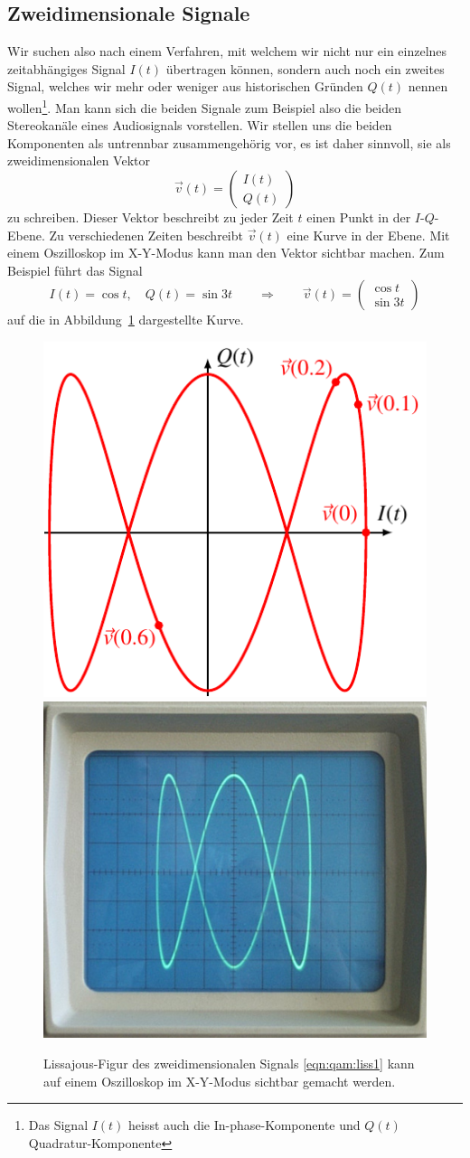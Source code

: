 %
%
%
\subsection{Zweidimensionale Signale
\label{subsection:qam:zweidimensional}}
Wir suchen also nach einem Verfahren, mit welchem wir nicht nur
ein einzelnes zeitabhängiges Signal $I(t)$ übertragen können, sondern
auch noch ein zweites Signal, welches wir mehr oder weniger aus
historischen Gründen $Q(t)$ nennen wollen\footnote{Das Signal $I(t)$
heisst auch die In-phase-Komponente und $Q(t)$ Quadratur-Komponente}.
Man kann sich die beiden Signale zum Beispiel also die beiden
Stereokanäle eines Audiosignals vorstellen.
Wir stellen uns die beiden Komponenten als untrennbar zusammengehörig
vor, es ist daher sinnvoll, sie als zweidimensionalen Vektor
\[
\vec{v}(t)
=
\begin{pmatrix}I(t)\\Q(t)\end{pmatrix}
\]
zu schreiben.
Dieser Vektor beschreibt zu jeder Zeit $t$ einen Punkt in der
$I$-$Q$-Ebene.
Zu verschiedenen Zeiten beschreibt $\vec{v}(t)$ eine Kurve
in der Ebene.
Mit einem Oszilloskop im X-Y-Modus kann man den Vektor
sichtbar machen.
Zum Beispiel führt das Signal
\begin{equation}
I(t) = \cos t,\quad
Q(t) = \sin 3t
\qquad
\Rightarrow
\qquad
\vec{v}(t)
=
\begin{pmatrix}
\cos t\\
\sin 3t
\end{pmatrix}
\label{eqn:qam:liss1}
\end{equation}
auf die in Abbildung~\ref{figure:qam:lissajous} dargestellte Kurve.
\begin{figure}
\centering
\includegraphics[width=0.48\hsize]{applications/qam/images/lissajous.pdf}
\includegraphics[width=0.48\hsize]{applications/qam/images/lissajous.jpg}
\caption{Lissajous-Figur des zweidimensionalen Signals
\eqref{eqn:qam:liss1} kann auf einem Oszilloskop im X-Y-Modus
sichtbar gemacht werden.
\label{figure:qam:lissajous}}
\end{figure}
